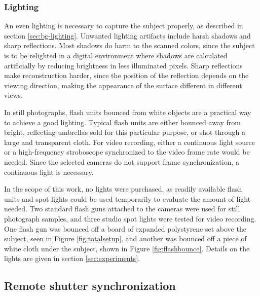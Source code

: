 
\subsubsection{Lighting}

An even lighting is necessary to capture the subject properly, as described in section \ref{sec:bg-lighting}.
Unwanted lighting artifacts include harsh shadows and sharp reflections.
Most shadows do harm to the scanned colors, since the subject is to be relighted in a digital environment where shadows are calculated artificially by reducing brightness in less illuminated pixels.
Sharp reflections make reconstruction harder, since the position of the reflection depends on the viewing direction, making the appearance of the surface different in different views.

In still photographs, flash units bounced from white objects are a practical way to achieve a good lighting.
Typical flash units are either bounced away from bright, reflecting umbrellas sold for this particular purpose, or shot through a large and transparent cloth.
For video recording, either a continuous light source or a high-frequency stroboscope synchronized to the video frame rate would be needed.
Since the selected cameras do not support frame synchronization, a continuous light is necessary.

In the scope of this work, no lights were purchased, as readily available flash units and spot lights could be used temporarily to evaluate the amount of light needed.
Two standard flash guns attached to the cameras were used for still photograph samples, and three studio spot lights were tested for video recording.
One flash gun was bounced off a board of expanded polystyrene set above the subject, seen in Figure \ref{fig:totalsetup}, and another was bounced off a piece of white cloth under the subject, shown in Figure \ref{fig:flashbounce}.
Details on the lights are given in section \ref{sec:experiments}.




\subsection{Remote shutter synchronization} %

